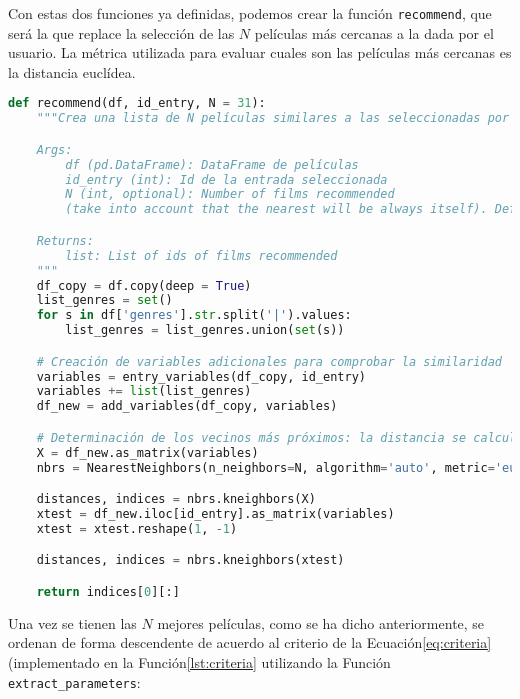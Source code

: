 Con estas dos funciones ya definidas, podemos crear la función \texttt{recommend}, que será la que replace la selección de las $N$ películas más cercanas a la dada por el usuario. La métrica utilizada para evaluar cuales son las películas más cercanas es la distancia euclídea.

\begin{lstlisting}[language=Python, caption=Obtención de las 30 mejores películas dada una por el usuario.]
def recommend(df, id_entry, N = 31):
    """Crea una lista de N películas similares a las seleccionadas por el usuario

    Args:
        df (pd.DataFrame): DataFrame de películas
        id_entry (int): Id de la entrada seleccionada
        N (int, optional): Number of films recommended 
        (take into account that the nearest will be always itself). Defaults to 31.

    Returns:
        list: List of ids of films recommended
    """
    df_copy = df.copy(deep = True)    
    list_genres = set()
    for s in df['genres'].str.split('|').values:
        list_genres = list_genres.union(set(s))    

    # Creación de variables adicionales para comprobar la similaridad
    variables = entry_variables(df_copy, id_entry)
    variables += list(list_genres)
    df_new = add_variables(df_copy, variables)

    # Determinación de los vecinos más próximos: la distancia se calcula con las nuevas vairables
    X = df_new.as_matrix(variables)
    nbrs = NearestNeighbors(n_neighbors=N, algorithm='auto', metric='euclidean').fit(X)

    distances, indices = nbrs.kneighbors(X)    
    xtest = df_new.iloc[id_entry].as_matrix(variables)
    xtest = xtest.reshape(1, -1)

    distances, indices = nbrs.kneighbors(xtest)

    return indices[0][:]
\end{lstlisting}

Una vez se tienen las $N$ mejores películas, como se ha dicho anteriormente, se ordenan de forma descendente de acuerdo al criterio de la Ecuación\ref{eq:criteria} (implementado en la Función\ref{lst:criteria} utilizando la Función \texttt{extract\_parameters}:

